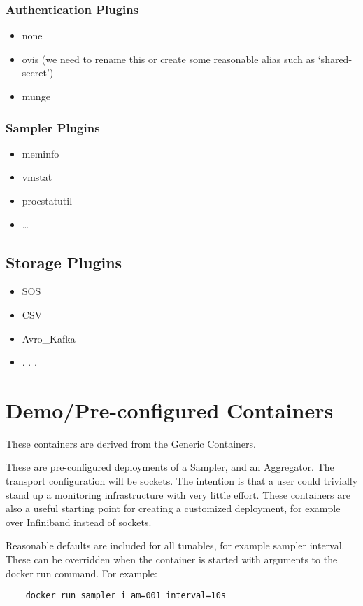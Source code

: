 \documentclass{article}
\begin{document}
\subsubsection{Authentication Plugins}
\begin{itemize}
    \item none
    \item ovis (we need to rename this or create some reasonable alias such as ‘shared-secret’)
    \item munge
\end{itemize}
\subsubsection{Sampler Plugins}
\begin{itemize}
\item meminfo
\item vmstat
\item procstatutil
\item …
\end{itemize}

\subsection{Storage Plugins}
\begin{itemize}
\item SOS
\item CSV
\item Avro\_Kafka
\item . . .
\end{itemize}

\section{Demo/Pre-configured Containers}
These containers are derived from the Generic Containers.

These are pre-configured deployments of a Sampler, and an Aggregator. The transport configuration will be sockets. The intention is that a user could trivially stand up a monitoring infrastructure with very little effort. These containers are also a useful starting point for creating a customized deployment, for example over Infiniband instead of sockets.

Reasonable defaults are included for all tunables, for example sampler interval. These can be overridden when the container is started with arguments to the docker run command. For example:

\begin{verbatim}
    docker run sampler i_am=001 interval=10s
\end{verbatim}
\end{document}
